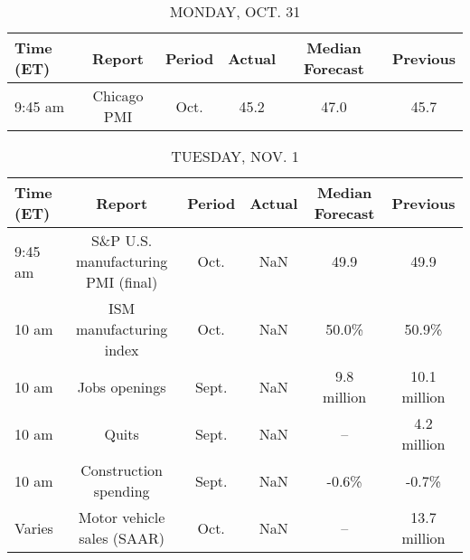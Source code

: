 \documentclass{article}%
\begin{document}
%
\normalsize%


\begin{table}[htbp]%
\caption{MONDAY, OCT. 31}%
\centering%
\begin{adjustbox}{width=1\textwidth}%
\begin{tabular}{lccccc}
\toprule
Time (ET) &      Report & Period & Actual & Median Forecast & Previous \\
\midrule
  9:45 am & Chicago PMI &   Oct. &   45.2 &            47.0 &     45.7 \\
\bottomrule
\end{tabular}
%
\end{adjustbox}%
\end{table}

%


\begin{table}[htbp]%
\caption{TUESDAY, NOV. 1}%
\centering%
\begin{adjustbox}{width=1\textwidth}%
\begin{tabular}{lccccc}
\toprule
Time (ET) &                             Report & Period & Actual & Median Forecast &     Previous \\
\midrule
  9:45 am & S\&P U.S. manufacturing PMI (final) &   Oct. &    NaN &            49.9 &         49.9 \\
    10 am &            ISM manufacturing index &   Oct. &    NaN &           50.0\% &        50.9\% \\
    10 am &                      Jobs openings &  Sept. &    NaN &     9.8 million & 10.1 million \\
    10 am &                              Quits &  Sept. &    NaN &              -- &  4.2 million \\
    10 am &              Construction spending &  Sept. &    NaN &           -0.6\% &        -0.7\% \\
   Varies &         Motor vehicle sales (SAAR) &   Oct. &    NaN &              -- & 13.7 million \\
\bottomrule
\end{tabular}
%
\end{adjustbox}%
\end{table}

%
\end{document}
